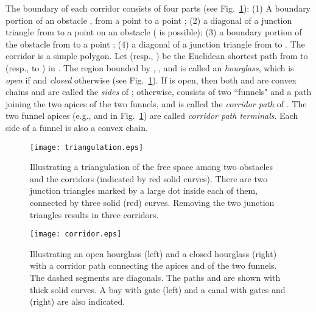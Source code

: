 \documentclass[english,runningheads,11pt]{llncs}
\begin{document}
The boundary of each corridor  consists of four parts (see
Fig.~\ref{fig:corridor}): (1) A boundary portion of an obstacle
, from a point  to a point ; (2) a diagonal of a
junction triangle from  to a point  on an obstacle
 ( is possible); (3) a boundary portion of
the obstacle  from  to a point ; (4) a diagonal of a
junction triangle from  to .
The corridor  is a simple polygon.
Let  (resp., ) be the Euclidean shortest path from  to 
(resp.,  to ) in . The region  bounded by
, , and
 is called an {\em hourglass}, which is {\em open} if
 and {\em closed} otherwise (see
Fig.~\ref{fig:corridor}). If  is open, then both  and
 are convex chains and are called the {\em sides} of
; otherwise,  consists of two ``funnels" and a path
 joining the two apices of the two
funnels, and  is called the {\em corridor path} of .
The two funnel apices (e.g.,  and  in Fig.~\ref{fig:corridor})
are called {\em corridor path terminals}.
Each side of a funnel is also a convex chain.



\begin{figure}[t]
\begin{minipage}[t]{0.47\linewidth}
\begin{center}
\texttt{[image: triangulation.eps]}
\caption{\footnotesize \cite{ref:ChenCo12arXiv,ref:ChenCo12ICALP} Illustrating a triangulation of the free
space among two obstacles and the corridors (indicated by red solid curves).
There are two junction triangles marked by a large dot inside
each of them, connected by three solid (red) curves. Removing the two
junction triangles results in three corridors.}
\label{fig:triangulation}
\end{center}
\end{minipage}
\hspace*{0.04in}
\begin{minipage}[t]{0.52\linewidth}
\begin{center}
\texttt{[image: corridor.eps]}
\caption{\footnotesize \cite{ref:ChenCo12arXiv,ref:ChenCo12ICALP} Illustrating an open hourglass (left) and a
closed hourglass (right) with a corridor path connecting the apices
 and  of the two funnels. The dashed segments are diagonals.
The paths  and  are shown with thick solid
curves. A bay  with gate  (left)
and a canal  with gates  and 
(right) are also indicated.} \label{fig:corridor}
\end{center}
\end{minipage}
\vspace*{-0.15in}
\end{figure}
\end{document}
